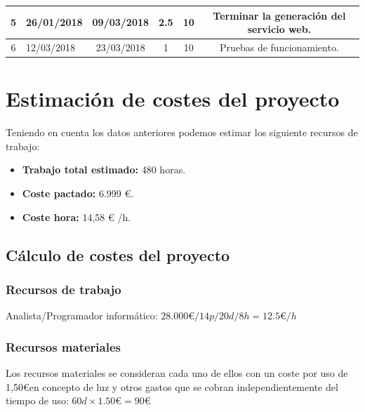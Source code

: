 \begin{table}[H]
\begin{tabular}{cccccc}
		\multicolumn{1}{|c|}{5} & \multicolumn{1}{l|}{26/01/2018} 
		& \multicolumn{1}{c|}{09/03/2018} & \multicolumn{1}{c|}{2.5} 
		& \multicolumn{1}{c|}{10}  & \multicolumn{1}{p{5.0cm}|}{
			Terminar la generación del servicio web. 		
		} \\ \hline
		
		\multicolumn{1}{|c|}{6} & \multicolumn{1}{l|}{12/03/2018} 
		& \multicolumn{1}{c|}{23/03/2018} & \multicolumn{1}{c|}{1} 
		& \multicolumn{1}{c|}{10}  & \multicolumn{1}{p{5.0cm}|}{
			Pruebas de funcionamiento.
		} \\ \hline

	\end{tabular}

\end{table}

\section{Estimación de costes del proyecto}

Teniendo en cuenta los datos anteriores podemos estimar los siguiente recursos de trabajo:
	\begin{itemize}
		\item \textbf{Trabajo total estimado:} 480 horas.
		\item \textbf{Coste pactado:}  6.999 €.
		\item \textbf{Coste hora:} 14,58 € /h.
	\end{itemize}

\subsection{Cálculo de costes del proyecto}

\subsubsection{Recursos de trabajo}

Analista/Programador informático: $ 28.000 \euro / 14p  / 20d  / 8h = 12.5 \euro/h $ 

\subsubsection{Recursos materiales}

Los recursos materiales se consideran cada uno de ellos con un coste por uso de 1,50\euro en concepto de luz y otros gastos que se cobran independientemente del tiempo de uso: $60d \times 1.50\euro= 90\euro$ 

